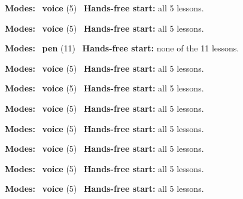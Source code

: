 \expandafter\def\csname hlchaptermodality57\endcsname{%
  {\small\noindent
    \textbf{Modes:} \hlvoicesign{}~\textbf{voice} (5)\quad
    \hlvoicesign{}~\textbf{Hands-free start:} all 5 lessons.%
    \par}\medskip
}

\expandafter\def\csname hlchaptermodality58\endcsname{%
  {\small\noindent
    \textbf{Modes:} \hlvoicesign{}~\textbf{voice} (5)\quad
    \hlvoicesign{}~\textbf{Hands-free start:} all 5 lessons.%
    \par}\medskip
}

\expandafter\def\csname hlchaptermodality59\endcsname{%
  {\small\noindent
    \textbf{Modes:} \hlpensign{}~\textbf{pen} (11)\quad
    \hlvoicesign{}~\textbf{Hands-free start:} none of the 11 lessons.%
    \par}\medskip
}

\expandafter\def\csname hlchaptermodality60\endcsname{%
  {\small\noindent
    \textbf{Modes:} \hlvoicesign{}~\textbf{voice} (5)\quad
    \hlvoicesign{}~\textbf{Hands-free start:} all 5 lessons.%
    \par}\medskip
}

\expandafter\def\csname hlchaptermodality61\endcsname{%
  {\small\noindent
    \textbf{Modes:} \hlvoicesign{}~\textbf{voice} (5)\quad
    \hlvoicesign{}~\textbf{Hands-free start:} all 5 lessons.%
    \par}\medskip
}

\expandafter\def\csname hlchaptermodality62\endcsname{%
  {\small\noindent
    \textbf{Modes:} \hlvoicesign{}~\textbf{voice} (5)\quad
    \hlvoicesign{}~\textbf{Hands-free start:} all 5 lessons.%
    \par}\medskip
}

\expandafter\def\csname hlchaptermodality63\endcsname{%
  {\small\noindent
    \textbf{Modes:} \hlvoicesign{}~\textbf{voice} (5)\quad
    \hlvoicesign{}~\textbf{Hands-free start:} all 5 lessons.%
    \par}\medskip
}

\expandafter\def\csname hlchaptermodality64\endcsname{%
  {\small\noindent
    \textbf{Modes:} \hlvoicesign{}~\textbf{voice} (5)\quad
    \hlvoicesign{}~\textbf{Hands-free start:} all 5 lessons.%
    \par}\medskip
}

\expandafter\def\csname hlchaptermodality65\endcsname{%
  {\small\noindent
    \textbf{Modes:} \hlvoicesign{}~\textbf{voice} (5)\quad
    \hlvoicesign{}~\textbf{Hands-free start:} all 5 lessons.%
    \par}\medskip
}

\expandafter\def\csname hlchaptermodality66\endcsname{%
  {\small\noindent
    \textbf{Modes:} \hlvoicesign{}~\textbf{voice} (5)\quad
    \hlvoicesign{}~\textbf{Hands-free start:} all 5 lessons.%
    \par}\medskip
}
